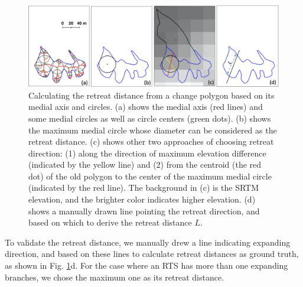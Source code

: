 \documentclass[authoryear,preprint,review,12pt]{elsarticle}
\begin{document}
\begin{figure} 
	\centering
	\includegraphics[width=14cm]{figs/retreat_distance_trim.jpg}
	\caption{Calculating the retreat distance from a change polygon based on its medial axis and circles. (a) shows the medial axis (red lines) and some medial circles as well as circle centers (green dots). (b) shows the maximum medial circle whose diameter can be considered as the retreat distance. (c) shows other two approaches of choosing retreat direction: (1) along the direction of maximum elevation difference (indicated by the yellow line) and (2) from the centroid (the red dot) of the old polygon to the center of the maximum medial circle (indicated by the red line). The background in (c) is the SRTM elevation, and the brighter color indicates higher elevation. (d) shows a manually drawn line pointing the retreat direction, and based on which to derive the retreat distance $L$. }
	\label{fig_retreat_dis}
\end{figure}





To validate the retreat distance, we manually drew a line indicating expanding direction, and based on these lines to calculate retreat distances as ground truth, as shown in Fig. \ref{fig_retreat_dis}d. 
For the case where an RTS has more than one expanding branches, we chose the maximum one as its retreat distance. 



\end{document}
